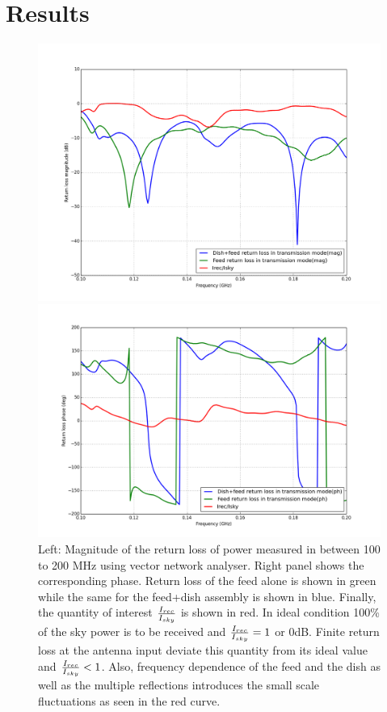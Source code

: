 \documentclass[twocolumn]{emulateapj}
\begin{document}
\section{Results}
\begin{figure}[ht]
\begin{minipage}[b]{\linewidth}
\centering
\includegraphics[angle=0, width=\linewidth]{plots/RL_mag.png}
\end{minipage}
\vspace{0.1cm}
\begin{minipage}[b]{\linewidth}
\centering
\includegraphics[angle=0, width=\linewidth]{plots/RL_phse.png}
\end{minipage}
\caption{Left: Magnitude of the return loss of power measured in between 100 to 200 MHz using vector network analyser. Right panel shows the corresponding phase. Return loss of the feed alone is shown in green while the same for the feed+dish assembly is shown in blue. Finally, the quantity of interest ${I_{rec}\over I_{sky}}$ is shown in red. In ideal condition 100\% of the sky power is to be received and ${I_{rec}\over I_{sky}} = 1$ or 0dB. Finite return loss at the antenna input deviate this quantity from its ideal value and ${I_{rec}\over I_{sky}} < 1$. Also, frequency dependence of the feed and the dish as well as the multiple reflections introduces the small scale fluctuations as seen in the red curve. }

\end{figure}
\end{document}

